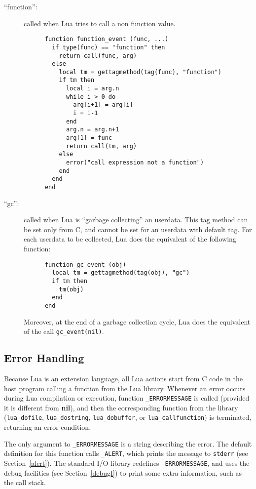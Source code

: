 \documentclass[11pt]{article}
\newcommand{\See}[1]{Section~\ref{#1}}
\newcommand{\see}[1]{(see \See{#1})}
\newcommand{\nil}{{\bf nil}}
\newcommand{\Deffunc}[1]{\index{#1}}
\begin{document}
\begin{description}
\item[``function'':]
called when Lua tries to call a non function value.
\begin{verbatim}
      function function_event (func, ...)
        if type(func) == "function" then
          return call(func, arg)
        else
          local tm = gettagmethod(tag(func), "function")
          if tm then
            local i = arg.n
            while i > 0 do
              arg[i+1] = arg[i]
              i = i-1
            end
            arg.n = arg.n+1
            arg[1] = func
            return call(tm, arg)
          else
            error("call expression not a function")
          end
        end
      end
\end{verbatim}

\item[``gc'':]
called when Lua is ``garbage collecting'' an userdata.
This tag method can be set only from C,
and cannot be set for an userdata with default tag.
For each userdata to be collected,
Lua does the equivalent of the following function:
\begin{verbatim}
      function gc_event (obj)
        local tm = gettagmethod(tag(obj), "gc")
        if tm then
          tm(obj)
        end
      end
\end{verbatim}
Moreover, at the end of a garbage collection cycle,
Lua does the equivalent of the call \verb|gc_event(nil)|.

\end{description}



\subsection{Error Handling} \label{error}

Because Lua is an extension language,
all Lua actions start from C code in the host program
calling a function from the Lua library.
Whenever an error occurs during Lua compilation or execution,
function \verb|_ERRORMESSAGE| is called \Deffunc{_ERRORMESSAGE}
(provided it is different from \nil),
and then the corresponding function from the library
(\verb|lua_dofile|, \verb|lua_dostring|,
\verb|lua_dobuffer|, or \verb|lua_callfunction|)
is terminated, returning an error condition.

The only argument to \verb|_ERRORMESSAGE| is a string
describing the error.
The default definition for
this function calls \verb|_ALERT|, \Deffunc{_ALERT}
which prints the message to \verb|stderr| \see{alert}.
The standard I/O library redefines \verb|_ERRORMESSAGE|,
and uses the debug facilities \see{debugI}
to print some extra information,
such as the call stack.
\end{document}
